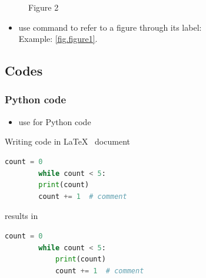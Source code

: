 \documentclass[report,english]{enacom}
\begin{document}
    \begin{figure}[h!]
    	\caption{Figure 2}
    \end{figure}
    \begin{itemize}
        \item use command  to refer to a figure through its label: \\
    	Example: \autoref{fig.figure1}.
    \end{itemize}


\subsection{Codes}

\subsubsection{Python code}
    \begin{itemize}
        \item use  for Python code
    \end{itemize}
    Writing code in \LaTeX~ document
    \begin{lcode}
    \begin{lstlisting}[language=python]
        count = 0
        while count < 5:
        print(count)
        count += 1  # comment
    \end{lstlisting}
    \end{lcode}
    results in
    \begin{lstlisting}[language=python]
        count = 0
        while count < 5:
            print(count)
            count += 1  # comment
    \end{lstlisting}
\end{document}
